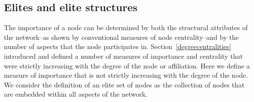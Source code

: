 %
%
%
%

\subsection{Elites and elite structures}

The importance of a node can be determined by both the structural attributes of the network--as shown by conventional measures of node centrality--and by the number of aspects that the node participates in. Section~\ref{degreecentralities} introduced and defined a number of measures of importance and centrality that were strictly increasing with the degree of the node or affiliation. Here we define a measure of importance that is not strictly increasing with the degree of the node. We consider the definition of an elite set of nodes as the collection of nodes that are embedded within all aspects of the network.

